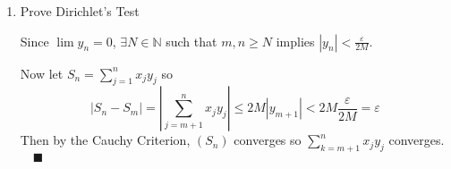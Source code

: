 \documentclass[12pt]{article}
\newcommand{\N}{\mathbb{N}}
\newcommand{\qed}{\quad \blacksquare}
\newcommand{\abs}[1]{\left\vert #1 \right\vert}
\newcommand{\ep}{\varepsilon}
\begin{document}
\begin{enumerate}
\begin{enumerate}[label=(\alph*)]
        \item Prove Dirichlet's Test
        
            \color{blue}
                Since $\lim y_n = 0$, $\exists N \in \N$ such that $m, n \geq N$ implies $\abs{y_n} < \frac{\ep}{2M}$. 

                Now let $S_n = \sum_{j=1}^{n} x_jy_j$ 
                so 
                \[\abs{S_n - S_m} = \abs{\sum_{j=m+1}^n x_jy_j} \leq 2M\abs{y_{m+1}} < 2M\frac{\ep}{2M} = \ep\]
                Then by the Cauchy Criterion, $(S_n)$ converges so $\sum_{k=m+1}^n x_jy_j$ converges. $\qed$
                
            \color{black}

    \end{enumerate}
\end{enumerate}
\end{document}
